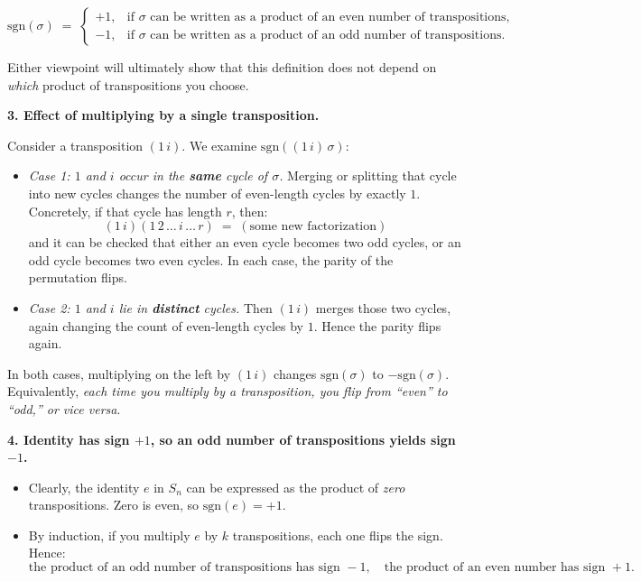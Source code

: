 \documentclass[12pt]{article}
\theoremstyle{definition} %
\theoremstyle{plain} %
\begin{document}
\[
\mathrm{sgn}(\sigma) \;=\;
\begin{cases}
+1, & \text{if $\sigma$ can be written as a product of an even number of transpositions,}\\
-1, & \text{if $\sigma$ can be written as a product of an odd number of transpositions.}
\end{cases}
\]

Either viewpoint will ultimately show that this definition does not depend on \emph{which} product of transpositions you choose.

\medskip

\noindent
\textbf{3. Effect of multiplying by a single transposition.}

Consider a transposition $(1\, i)$.  We examine $\mathrm{sgn}((1\, i)\,\sigma)$:

\begin{itemize}
    \item \emph{Case 1: $1$ and $i$ occur in the \textbf{same} cycle of $\sigma$.} 
    Merging or splitting that cycle into new cycles changes the number of even-length cycles by exactly $1$.  Concretely, if that cycle has length $r$, then:
    \[
       (1\, i)(1\,2\,\dots\, i\,\dots\,r)
       \;=\;
       (\text{some new factorization})
    \]
    and it can be checked that either an even cycle becomes two odd cycles, or an odd cycle becomes two even cycles.  In each case, the parity of the permutation flips.

    \item \emph{Case 2: $1$ and $i$ lie in \textbf{distinct} cycles.}
    Then $(1\, i)$ merges those two cycles, again changing the count of even-length cycles by $1$.  Hence the parity flips again.
\end{itemize}

In both cases, multiplying on the left by $(1\,i)$ changes $\mathrm{sgn}(\sigma)$ to $-\mathrm{sgn}(\sigma)$.  Equivalently, \emph{each time you multiply by a transposition, you flip from “even” to “odd,” or vice versa}. 

\medskip

\noindent
\textbf{4. Identity has sign $+1$, so an odd number of transpositions yields sign $-1$.}

\begin{itemize}
    \item Clearly, the identity $e$ in $S_n$ can be expressed as the product of \emph{zero} transpositions.  Zero is even, so $\mathrm{sgn}(e) = +1$.
    \item By induction, if you multiply $e$ by $k$ transpositions, each one flips the sign. Hence:
    \[
    \text{the product of an odd number of transpositions has sign }-1,\quad
    \text{the product of an even number has sign }+1.
    \]
\end{itemize}
\end{document}
